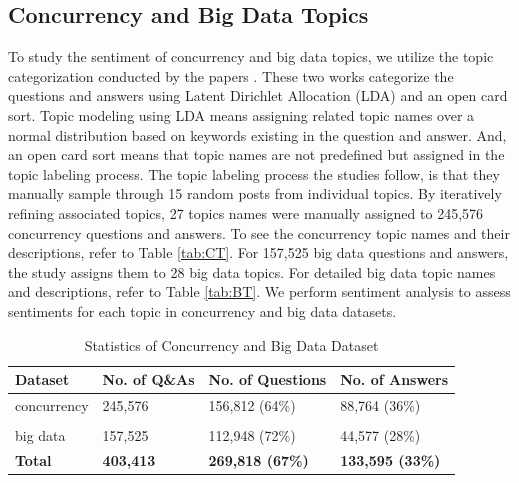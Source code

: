 \subsection{Concurrency and Big Data Topics} 
\label{topicssec}
To study the sentiment of concurrency and big data topics, we utilize the topic categorization conducted by the papers \cite{ahmed2018concurrency, bagherzadeh2019going}. These two works categorize the questions and answers using Latent Dirichlet Allocation (LDA) \cite{blei2003latent} and an open card sort. Topic modeling using LDA means assigning related topic names over a normal distribution based on keywords existing in the question and answer. And, an open card sort means that topic names are not predefined but assigned in the topic labeling process. The topic labeling process the studies \cite{ahmed2018concurrency, bagherzadeh2019going} follow, is that they manually sample through 15 random posts from individual topics. By iteratively refining associated topics, 27 topics names were manually assigned to 245,576 concurrency questions and answers. To see the concurrency topic names and their descriptions, refer to Table \ref{tab:CT}. For 157,525 big data questions and answers, the study \cite{bagherzadeh2019going} assigns them to 28 big data topics. For detailed big data topic names and descriptions, refer to Table \ref{tab:BT}. We perform sentiment analysis to assess sentiments for each topic in concurrency and big data datasets.

\begin{table}[h!bt]
\caption{Statistics of Concurrency and Big Data Dataset}
\label{tabStat}
\centering 
\begin{tabular}{p{.9in}p{1.4in}p{1.4in}p{1.4in}} \hline
\textbf{Dataset} & \textbf{No. of Q\&As} & \textbf{No. of Questions} & \textbf{No. of Answers}\\  \hline
concurrency & 245,576 & 156,812 (64\%) & 88,764 (36\%) \\
\\
big data & 157,525 & 112,948 (72\%) & 44,577 (28\%) \\\hline
\textbf{Total} & \textbf{403,413} & \textbf{269,818 (67\%)} & \textbf{133,595 (33\%)} \\ \hline
\end{tabular}
\end{table}

